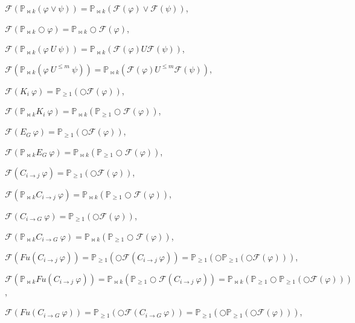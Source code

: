 $\mathscr{F}(\mathbb{P}_{\bowtie k}(\varphi \vee \psi))=\mathbb{P}_{\bowtie k}(\mathscr{F}(\varphi) \vee \mathscr{F}(\psi))$,

$\mathscr{F}(\mathbb{P}_{\bowtie k}\bigcirc \varphi)=\mathbb{P}_{\bowtie k} \bigcirc \mathscr{F}(\varphi)$,

$\mathscr{F}(\mathbb{P}_{\bowtie k}(\varphi~ U ~ \psi))=\mathbb{P}_{\bowtie k} (\mathscr{F}(\varphi) U \mathscr{F}(\psi))$,

$\mathscr{F}(\mathbb{P}_{\bowtie k}(\varphi~ U^{\leq m} ~ \psi))=\mathbb{P}_{\bowtie k} (\mathscr{F}(\varphi) U^{\leq m} \mathscr{F}(\psi))$,

$\mathscr{F}(K_i ~\varphi)= \mathbb{P}_{\geq 1}(\bigcirc \mathscr{F}(\varphi))$,

$\mathscr{F}(\mathbb{P}_{\bowtie k} K_i ~\varphi)= \mathbb{P}_{\bowtie k}(\mathbb{P}_{\geq 1}\bigcirc\mathscr{F}(\varphi))$,

$\mathscr{F}(E_G ~\varphi)= \mathbb{P}_{\geq 1}(\bigcirc \mathscr{F}(\varphi))$,

$\mathscr{F}(\mathbb{P}_{\bowtie k} E_G ~\varphi)= \mathbb{P}_{\bowtie k}(\mathbb{P}_{\geq 1}\bigcirc\mathscr{F}(\varphi))$,

$\mathscr{F}(C_{i\rightarrow j} ~\varphi)= \mathbb{P}_{\geq 1}(\bigcirc \mathscr{F}(\varphi))$,

$\mathscr{F}(\mathbb{P}_{\bowtie k} C_{i\rightarrow j} ~\varphi)= \mathbb{P}_{\bowtie k}(\mathbb{P}_{\geq 1}\bigcirc\mathscr{F}(\varphi))$,

$\mathscr{F}(C_{i\rightarrow G} ~\varphi)= \mathbb{P}_{\geq 1}(\bigcirc \mathscr{F}(\varphi))$,

$\mathscr{F}(\mathbb{P}_{\bowtie k} C_{i\rightarrow G} ~\varphi)= \mathbb{P}_{\bowtie k}(\mathbb{P}_{\geq 1}\bigcirc\mathscr{F}(\varphi))$,

$\mathscr{F}(Fu(C_{i\rightarrow j} ~\varphi))= \mathbb{P}_{\geq 1}(\bigcirc \mathscr{F}(C_{i\rightarrow j} ~\varphi))= \mathbb{P}_{\geq 1}(\bigcirc\mathbb{P}_{\geq 1}(\bigcirc \mathscr{F}(\varphi)))$,

$\mathscr{F}(\mathbb{P}_{\bowtie k} Fu(C_{i\rightarrow j} ~\varphi))= \mathbb{P}_{\bowtie k} (\mathbb{P}_{\geq 1}\bigcirc\mathscr{F}(C_{i\rightarrow j} ~\varphi))= \mathbb{P}_{\bowtie k}(\mathbb{P}_{\geq 1}\bigcirc\mathbb{P}_{\geq 1}(\bigcirc \mathscr{F}(\varphi)))$,

$\mathscr{F}(Fu(C_{i\rightarrow G} ~\varphi))= \mathbb{P}_{\geq 1}(\bigcirc \mathscr{F}(C_{i\rightarrow G} ~\varphi))= \mathbb{P}_{\geq 1}(\bigcirc\mathbb{P}_{\geq 1}(\bigcirc \mathscr{F}(\varphi)))$,

